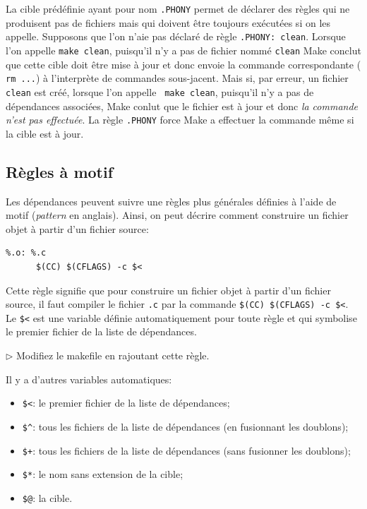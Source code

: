 \documentclass[11pt,a4paper]{article}
\newcommand{\must}{\noindent $\triangleright$ \xspace}
\newcommand{\bitem}{\item[$\bullet$]}
\begin{document}
La cible prédéfinie ayant pour nom \texttt{\small .PHONY} permet de
déclarer des règles qui ne produisent pas de fichiers mais qui doivent
être toujours exécutées si on les appelle. Supposons que l'on n'aie
pas déclaré de règle \texttt{\small .PHONY: clean}. Lorsque l'on
appelle \texttt{\small make clean}, puisqu'il n'y a pas de fichier
nommé \texttt{clean} \textsf{Make} conclut que cette cible doit être
mise à jour et donc envoie la commande correspondante (\texttt{\small
rm ...}) à l'interprète de commandes sous-jacent. Mais si, par erreur,
un fichier \texttt{clean} est créé, lorsque l'on appelle \texttt{\small
make clean}, puisqu'il n'y a pas de dépendances associées,
\textsf{Make} conlut que le fichier est à jour et donc \emph{la
commande n'est pas effectuée}. La règle \texttt{\small .PHONY} force
\textsf{Make} a effectuer la commande même si la cible est à jour.

\subsection{Règles à motif}
\label{regle_a_motif}

Les dépendances peuvent suivre une règles plus générales définies à
l'aide de motif (\emph{pattern} en anglais). Ainsi, on peut décrire
comment construire un fichier objet à partir d'un fichier source:
{\small
\begin{verbatim}
%.o: %.c
      $(CC) $(CFLAGS) -c $<
\end{verbatim}
}

\noindent Cette règle signifie que pour construire un fichier objet à
partir d'un fichier source, il faut compiler le fichier \texttt{.c}
par la commande {\small \verb!$(CC) $(CFLAGS) -c $<!}. Le \verb!$<!
est une variable définie automatiquement pour toute règle et qui
symbolise le premier fichier de la liste de dépendances.

\medskip

\must Modifiez le makefile en rajoutant cette règle.

\medskip

\noindent Il y a d'autres variables automatiques:

\begin{itemize}

  \bitem \verb!$<!: le premier fichier de la liste de dépendances;

  \bitem \verb!$^!: tous les fichiers de la liste de dépendances (en
  fusionnant les doublons);

  \bitem \verb!$+!: tous les fichiers de la liste de dépendances (sans
  fusionner les doublons);

  \bitem \verb!$*!: le nom sans extension de la cible;

  \bitem \verb!$@!: la cible.

\end{itemize}
\end{document}
